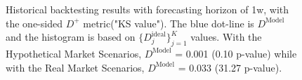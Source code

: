 \documentclass[preprint,12pt]{elsarticle}
\begin{document}
\begin{figure}[h] 
\hfill
{}
\hfill
{}
\hfill
\caption{Historical backtesting results with forecasting horizon of 1w, with the one-sided $D^+$ metric("KS value"). The blue dot-line is $D^{\textrm{Model}}$ and the histogram is based on $\{D^{\textrm{ideal}}_j\}_{j=1}^K$ values. With the Hypothetical Market Scenarios, $D^{\textrm{Model}}$ = 0.001 (0.10 p-value) while with the Real Market Scenarios, $D^{\textrm{Model}}$ = 0.033 (31.27 p-value).}
\label{fig:backtestingHistogram1w}
\end{figure}
\end{document}
